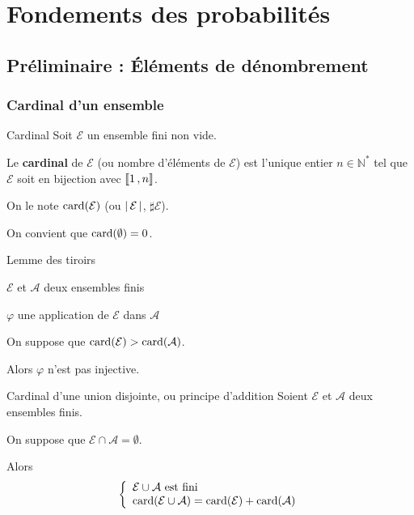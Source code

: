 \chapter[Probabilités]{Fondements des probabilités}
\chaptertoc

\section{Préliminaire : Éléments de dénombrement}

    \subsection{Cardinal d’un ensemble}

    \begin{defi}{Cardinal}{}
        Soit $\mathcal{E}$ un ensemble fini non vide.

        Le \textbf{cardinal} de $\mathcal{E}$ (ou nombre d’éléments de $\mathcal{E}$) est l’unique entier $n \in \mathbb{N}^*$ tel que $\mathcal{E}$ soit en bijection avec $\left\llbracket 1 \, , n \right\rrbracket$. 

        On le note $\operatorname{card}(\mathcal{E})$ (ou $\left\lvert \,\mathcal{E} \, \right\rvert$, $\sharp \mathcal{E}$). 

        On convient que $\operatorname{card}(\emptyset) = 0$.
    \end{defi}

    \begin{lem}{Lemme des tiroirs}{}
        \begin{soient}
            \item $\mathcal{E}$ et $\mathcal{A}$ deux ensembles finis
            \item $\varphi$ une application de $\mathcal{E}$ dans $\mathcal{A}$
        \end{soient}
        On suppose que $\operatorname{card}(\mathcal{E}) > \operatorname{card}(\mathcal{A})$.

        Alors $\varphi$ n’est pas injective.
    \end{lem}

    \begin{prop}{Cardinal d’une union disjointe, ou principe d’addition}{}
        Soient $\mathcal{E}$ et $\mathcal{A}$ deux ensembles finis. 

        On suppose que $\mathcal{E} \cap \mathcal{A} = \emptyset$.

        Alors 
        \[ \et{\mathcal{E} \cup \mathcal{A} \text{ est fini}}{\card(\mathcal{E} \cup \mathcal{A}) = \card(\mathcal{E}) + \card(\mathcal{A})} \]
    \end{prop}

